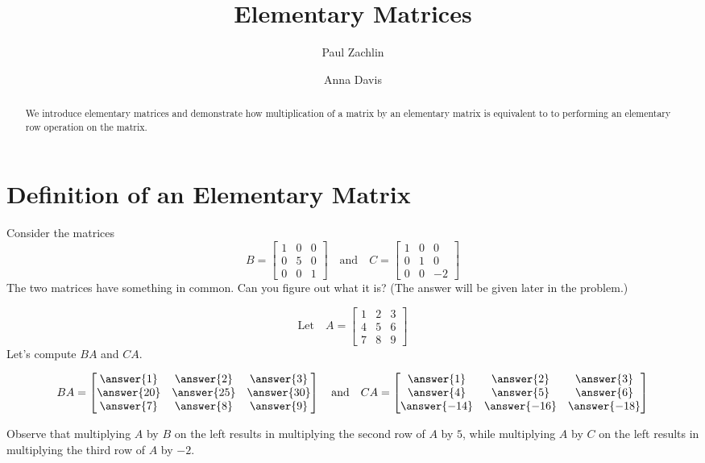 \documentclass{ximera}
\author{Paul Zachlin \and Anna Davis} \title{Elementary Matrices} \license{CC-BY 4.0}
\begin{document}
\begin{abstract}
 We introduce elementary matrices and demonstrate how multiplication of a matrix by an elementary matrix is equivalent to to performing an elementary row operation on the matrix.
\end{abstract}
\maketitle

\section*{Definition of an Elementary Matrix}

\begin{initprob}\label{init:elementarymat2}
Consider the matrices
$$B = \begin{bmatrix}  
 1&0&0\\0&5&0\\0&0&1
 \end{bmatrix}
 \quad \text{and}\quad
 C = \begin{bmatrix}  
 1&0&0\\0&1&0\\0&0&-2
 \end{bmatrix}
$$
The two matrices have something in common.  Can you figure out what it is?  (The answer will be given later in the problem.)

$$\text{Let}\quad A = \begin{bmatrix}  
 1&2&3\\4&5&6\\7&8&9
 \end{bmatrix}$$
Let's compute $BA$ and $CA$.

$$BA=\begin{bmatrix}\answer{1} & \answer{2} & \answer{3} \\ \answer{20} & \answer{25} & \answer{30}\\ \answer{7} & \answer{8} & \answer{9}\end{bmatrix}
\quad
\text{and}
\quad
CA=\begin{bmatrix}\answer{1} & \answer{2} & \answer{3} \\ \answer{4} & \answer{5} & \answer{6}\\ \answer{-14} & \answer{-16} & \answer{-18}\end{bmatrix}$$

Observe that multiplying $A$ by $B$ on the left results in multiplying the second row of $A$ by $5$, while multiplying $A$ by $C$ on the left results in multiplying the third row of $A$ by $-2$.


\end{initprob}
\end{document}
